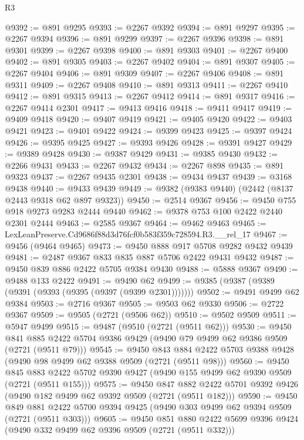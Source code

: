 \begin{lexlean}{R3}
\begin{coremodule}
@9392 := @891 @9295
@9393 := @2267 @9392
@9394 := @891 @9297
@9395 := @2267 @9394
@9396 := @891 @9299
@9397 := @2267 @9396
@9398 := @891 @9301
@9399 := @2267 @9398
@9400 := @891 @9303
@9401 := @2267 @9400
@9402 := @891 @9305
@9403 := @2267 @9402
@9404 := @891 @9307
@9405 := @2267 @9404
@9406 := @891 @9309
@9407 := @2267 @9406
@9408 := @891 @9311
@9409 := @2267 @9408
@9410 := @891 @9313
@9411 := @2267 @9410
@9412 := @891 @9315
@9413 := @2267 @9412
@9414 := @891 @9317
@9416 := @2267 @9414 @2301
@9417 := @9413 @9416
@9418 := @9411 @9417
@9419 := @9409 @9418
@9420 := @9407 @9419
@9421 := @9405 @9420
@9422 := @9403 @9421
@9423 := @9401 @9422
@9424 := @9399 @9423
@9425 := @9397 @9424
@9426 := @9395 @9425
@9427 := @9393 @9426
@9428 := @9391 @9427
@9429 := @9389 @9428
@9430 := @9387 @9429
@9431 := @9385 @9430
@9432 := @2266 @9431
@9433 := @2267 @9432
@9434 := @2267 @898
@9435 := @891 @9323
@9437 := @2267 @9435 @2301
@9438 := @9434 @9437
@9439 := @3168 @9438
@9440 := @9433 @9439
@9449 := @9382 (@9383 @9440) (@2442 (@8137 @2443 @9318 @62 @897 @9323))
@9450 := @2514 @9367
@9456 := @9450 @755 @918 @9273 @9283 @2444 @9440
@9462 := @9378 @753 @100 @2422 @2440 @2301 @2444
@9463 := @2585 @9367
@9464 := @9462 @9463
@9465 := LexLeanPreserve.Cd9686f88d3d76fcf0b583f359c728594.R3.__rel_17
@9467 := @9456 (@9464 @9465)
@9473 := @9450 @888 @917 @5708 @9282 @9432 @9439
@9481 := @2487 @9367 @833 @835 @887 @5706 @2422 @9431 @9432
@9487 := @9450 @839 @886 @2422 @5705 @9384 @9430
@9488 := @5888 @9367
@9490 := @9488 @133 @2422
@9491 := @9490 @62
@9499 := @9385 (@9387 (@9389 (@9391 (@9393 (@9395 (@9397 (@9399 @2301)))))))
@9502 := @9491 @9499 @62 @9384
@9503 := @2716 @9367
@9505 := @9503 @62 @9330
@9506 := @2722 @9367
@9509 := @9505 (@2721 (@9506 @62))
@9510 := @9502 @9509
@9511 := @5947 @9499
@9515 := @9487 (@9510 (@2721 (@9511 @62)))
@9530 := @9450
    @841
    @885
    @2422
    @5704
    @9386
    @9429
    (@9490 @79 @9499 @62 @9386 @9509 (@2721 (@9511 @79)))
@9545 := @9450
    @843
    @884
    @2422
    @5703
    @9388
    @9428
    (@9490 @98 @9499 @62 @9388 @9509 (@2721 (@9511 @98)))
@9560 := @9450
    @845
    @883
    @2422
    @5702
    @9390
    @9427
    (@9490 @155 @9499 @62 @9390 @9509 (@2721 (@9511 @155)))
@9575 := @9450
    @847
    @882
    @2422
    @5701
    @9392
    @9426
    (@9490 @182 @9499 @62 @9392 @9509 (@2721 (@9511 @182)))
@9590 := @9450
    @849
    @881
    @2422
    @5700
    @9394
    @9425
    (@9490 @303 @9499 @62 @9394 @9509 (@2721 (@9511 @303)))
@9605 := @9450
    @851
    @880
    @2422
    @5699
    @9396
    @9424
    (@9490 @332 @9499 @62 @9396 @9509 (@2721 (@9511 @332)))

\end{coremodule}
\end{lexlean}
